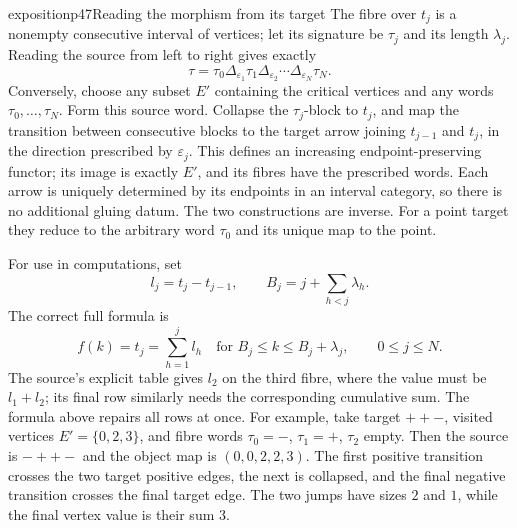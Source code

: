 \begin{dcomment}{exposition}{p47}{Reading the morphism from its target}
The fibre over $t_j$ is a nonempty consecutive interval of vertices; let its signature be $\tau_j$ and its length $\lambda_j$. Reading the source from left to right gives exactly
\[
 \tau=\tau_0\Delta_{\varepsilon_1}\tau_1
        \Delta_{\varepsilon_2}\cdots
        \Delta_{\varepsilon_N}\tau_N.
\]
Conversely, choose any subset $E'$ containing the critical vertices and any words $\tau_0,\ldots,\tau_N$. Form this source word. Collapse the $\tau_j$-block to $t_j$, and map the transition between consecutive blocks to the target arrow joining $t_{j-1}$ and $t_j$, in the direction prescribed by $\varepsilon_j$. This defines an increasing endpoint-preserving functor; its image is exactly $E'$, and its fibres have the prescribed words. Each arrow is uniquely determined by its endpoints in an interval category, so there is no additional gluing datum. The two constructions are inverse. For a point target they reduce to the arbitrary word $\tau_0$ and its unique map to the point.

For use in computations, set
\[
 l_j=t_j-t_{j-1},\qquad
 B_j=j+\sum_{h<j}\lambda_h.
\]
The correct full formula is
\[
 f(k)=t_j=\sum_{h=1}^{j}l_h
 \quad\text{for } B_j\leq k\leq B_j+\lambda_j,
 \qquad 0\leq j\leq N.
\]
The source's explicit table gives $l_2$ on the third fibre, where the value must be $l_1+l_2$; its final row similarly needs the corresponding cumulative sum. The formula above repairs all rows at once. For example, take target $++-$, visited vertices $E'=\{0,2,3\}$, and fibre words $\tau_0=-$, $\tau_1=+$, $\tau_2$ empty. Then the source is $-++-$ and the object map is $(0,0,2,2,3)$. The first positive transition crosses the two target positive edges, the next is collapsed, and the final negative transition crosses the final target edge. The two jumps have sizes $2$ and $1$, while the final vertex value is their sum $3$.
\end{dcomment}

